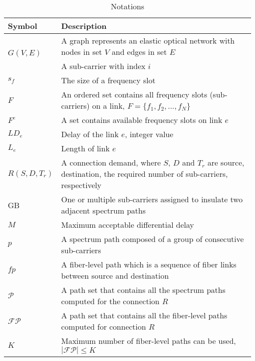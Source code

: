 \documentclass[conference]{IEEEtran}
\begin{document}
  \begin{table} 
\small
\begin{tabular}{|p{}|p{}|} 
\hline
Symbol & Description \\ \hline \hline
\multirow{2}{*}{$G(V, E)$} & A graph represents an elastic optical network with  nodes in  set $V$ and edges in set $E$ \\
$f_i$ & A sub-carrier with index $i$ \\
 $s_f$ & The size of a frequency slot\\
$F$ & An ordered set contains all frequency slots (sub-carriers) on a link, $F =\{f_1, f_2, ..., f_N\}$ \\
$F^e$ & A set  contains available frequency slots on link $e$ \\
${LD}_e$ & Delay of the link $e$,  integer value \\
$L_e$ & Length of link $e$\\
$R(S, D,T_r)$ & A connection demand, where    $S$, $D$ and $T_r$ are source, destination, the required number of sub-carriers, respectively  \\
GB &  One or multiple sub-carriers assigned to insulate two adjacent spectrum paths\\
$M$ & Maximum acceptable differential delay  \\
$p$ & A spectrum path composed of a group of consecutive sub-carriers\\
$fp$ & A fiber-level path which is a sequence of fiber links between source and destination\\
  $\mathcal{P}$ & A path set that contains all the spectrum paths computed for the connection $R$ \\ 
  $\mathcal{FP}$ & A path set that contains all the fiber-level paths computed for connection $R$ \\  
    $K$ & Maximum number of fiber-level paths can be used, $|\mathcal{FP}|\leq K$ \\  
     \hline 
\end{tabular}
\caption{Notations}
\label{tab:notation}
\end{table}
        
        
\end{document}
